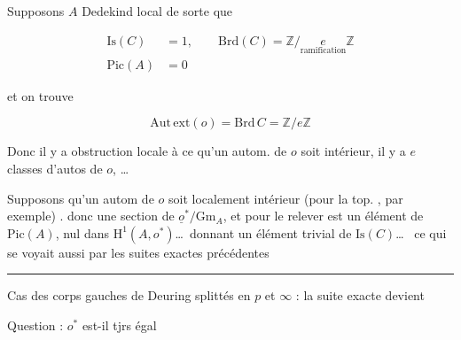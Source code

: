 Supposons $A$  Dedekind \deleted{\unsure{$\ne$}} local  de sorte que

\[
\begin{aligned}
\mathrm{Is}(C)&=1,\qquad \mathrm{Brd}(C)=\mathbb{Z}/\underset{\text{ramification}}{e}\mathbb{Z}\\
\mathrm{Pic}(A)&=0
\end{aligned}
\]

et on trouve

\[
\mathrm{Aut\,ext}(o)=\mathrm{Brd}\, C=\mathbb{Z}/e\mathbb{Z}
\]

Donc il y a obstruction locale à ce qu'un autom. de $o$ soit  intérieur, il y a $e$ classes d'autos de $o$, \ldots

Supposons  qu'un autom de $o$ soit localement intérieur (pour la top. , par exemple) .   donc une section de $\underline{o}^*/\mathrm{Gm}_A$, et   pour le relever est un élément de $\mathrm{Pic}(A)$, nul dans  $\mathrm{H}^1(A,o^*)$\ldots\ donnant un élément trivial de $\mathrm{Is}(C)$\ldots\  ce qui se voyait aussi par les suites exactes précédentes

\begin{center}\rule{0.22\linewidth}{0.3pt}\end{center}

Cas des corps gauches de Deuring splittés en $p$ et $\infty$ : la suite exacte devient









Question : $o^*$ est-il tjrs égal

